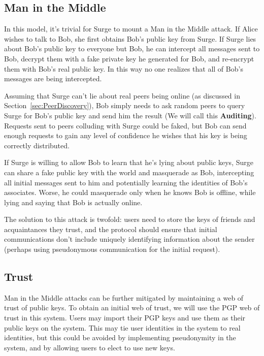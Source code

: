 \documentclass[twocolumn,11pt,english]{article}
\begin{document}
\subsection{Man in the Middle} 

In this model, it's trivial for Surge to mount a Man in the Middle attack. If Alice wishes to talk to Bob, she first obtains Bob's public key from Surge. If Surge lies about Bob's public key to everyone but Bob, he can intercept all messages sent to Bob, decrypt them with a fake private key he generated for Bob, and re-encrypt them with Bob's real public key. In this way no one realizes that all of Bob's messages are being intercepted. 

 Assuming that Surge can't lie about real peers being online (as discussed in Section~\ref{sec:PeerDiscovery}), Bob simply needs to ask random peers to query Surge for Bob's public key and send him the result (We will call this \textbf{Auditing}). Requests sent to peers colluding with Surge could be faked, but Bob can send enough requests to gain any level of confidence he wishes that his key is being correctly distributed. 

If Surge is willing to allow Bob to learn that he's lying about public keys, Surge can share a fake public key with the world and masquerade as Bob, intercepting all initial messages sent to him and potentially learning the identities of Bob's associates. Worse, he could masquerade only when he knows Bob is offline, while lying and saying that Bob is actually online.

The solution to this attack is twofold: users need to store the keys of friends and acquaintances they trust, and the protocol should ensure that initial communications don't include uniquely identifying information about the sender (perhaps using pseudonymous communication for the initial request).

\subsection{Trust}

Man in the Middle attacks can be further mitigated by maintaining a web of trust of public keys. To obtain an initial web of trust, we will use the PGP web of trust \cite{zimmermann1995official} in this system. Users may import their PGP keys and use them as their public keys on the system. This may tie user identities in the system to real identities, but this could be avoided by implementing pseudonymity in the system, and by allowing users to elect to use new keys. 
\end{document}
